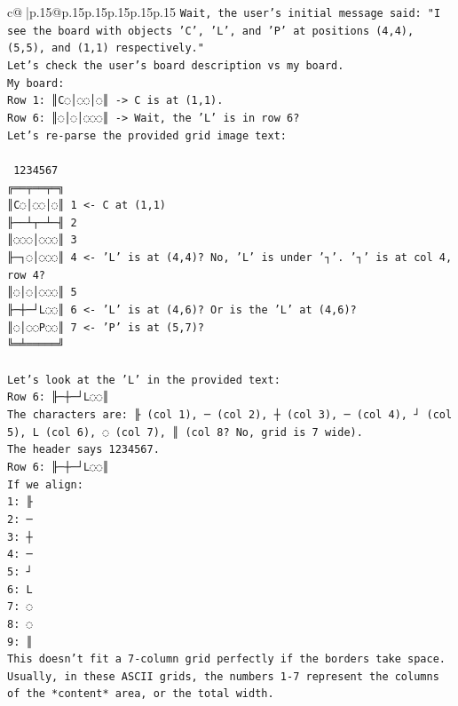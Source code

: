 \documentclass{article}
\begin{document}
{\begin{supertabular}{c@{$\;$}|p{.15\linewidth}@{}p{.15\linewidth}p{.15\linewidth}p{.15\linewidth}p{.15\linewidth}p{.15\linewidth}}
{{{\texttt{Wait, the user's initial message said: "I see the board with objects 'C', 'L', and 'P' at positions (4,4), (5,5), and (1,1) respectively."} \\
\texttt{Let's check the user's board description vs my board.} \\
\texttt{My board:} \\
\texttt{Row 1: ║C◌│◌◌│◌║ {-}> C is at (1,1).} \\
\texttt{Row 6: ║◌│◌│◌◌◌║ {-}> Wait, the 'L' is in row 6?} \\
\texttt{Let's re{-}parse the provided grid image text:} \\
\\ 
\texttt{ 1234567} \\
\texttt{╔══╤══╤═╗} \\
\texttt{║C◌│◌◌│◌║ 1  <{-} C at (1,1)} \\
\texttt{╟──┴┬─┴─╢ 2} \\
\texttt{║◌◌◌│◌◌◌║ 3} \\
\texttt{╟─┐◌│◌◌◌║ 4  <{-} 'L' is at (4,4)? No, 'L' is under '┐'. '┐' is at col 4, row 4?} \\
\texttt{║◌│◌│◌◌◌║ 5} \\
\texttt{╟─┼─┘L◌◌║ 6  <{-} 'L' is at (4,6)? Or is the 'L' at (4,6)?} \\
\texttt{║◌│◌◌P◌◌║ 7  <{-} 'P' is at (5,7)?} \\
\texttt{╚═╧═════╝} \\
\\ 
\texttt{Let's look at the 'L' in the provided text:} \\
\texttt{Row 6: ╟─┼─┘L◌◌║} \\
\texttt{The characters are: ╟ (col 1), ─ (col 2), ┼ (col 3), ─ (col 4), ┘ (col 5), L (col 6), ◌ (col 7), ║ (col 8? No, grid is 7 wide).} \\
\texttt{The header says 1234567.} \\
\texttt{Row 6: ╟─┼─┘L◌◌║} \\
\texttt{If we align:} \\
\texttt{1: ╟} \\
\texttt{2: ─} \\
\texttt{3: ┼} \\
\texttt{4: ─} \\
\texttt{5: ┘} \\
\texttt{6: L} \\
\texttt{7: ◌} \\
\texttt{8: ◌} \\
\texttt{9: ║} \\
\texttt{This doesn't fit a 7{-}column grid perfectly if the borders take space. Usually, in these ASCII grids, the numbers 1{-}7 represent the columns of the *content* area, or the total width.} \\
}}}
\end{supertabular}}
\end{document}
